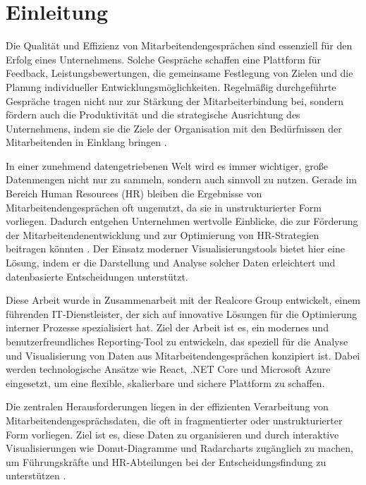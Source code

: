 \chapter{Einleitung}
\label{chap:einleitung}

Die Qualität und Effizienz von Mitarbeitendengesprächen sind essenziell für den Erfolg eines Unternehmens. Solche Gespräche schaffen eine Plattform für Feedback, Leistungsbewertungen, die gemeinsame Festlegung von Zielen und die Planung individueller Entwicklungsmöglichkeiten. Regelmäßig durchgeführte Gespräche tragen nicht nur zur Stärkung der Mitarbeiterbindung bei, sondern fördern auch die Produktivität und die strategische Ausrichtung des Unternehmens, indem sie die Ziele der Organisation mit den Bedürfnissen der Mitarbeitenden in Einklang bringen \cite{schober2008, bryson2011employee}.

In einer zunehmend datengetriebenen Welt wird es immer wichtiger, große Datenmengen nicht nur zu sammeln, sondern auch sinnvoll zu nutzen. Gerade im Bereich Human Resources (HR) bleiben die Ergebnisse von Mitarbeitendengesprächen oft ungenutzt, da sie in unstrukturierter Form vorliegen. Dadurch entgehen Unternehmen wertvolle Einblicke, die zur Förderung der Mitarbeitendenentwicklung und zur Optimierung von HR-Strategien beitragen könnten \cite{kirk2016data}. Der Einsatz moderner Visualisierungstools bietet hier eine Lösung, indem er die Darstellung und Analyse solcher Daten erleichtert und datenbasierte Entscheidungen unterstützt. 

Diese Arbeit wurde in Zusammenarbeit mit der Realcore Group entwickelt, einem führenden IT-Dienstleister, der sich auf innovative Lösungen für die Optimierung interner Prozesse spezialisiert hat. Ziel der Arbeit ist es, ein modernes und benutzerfreundliches Reporting-Tool zu entwickeln, das speziell für die Analyse und Visualisierung von Daten aus Mitarbeitendengesprächen konzipiert ist. Dabei werden technologische Ansätze wie React, .NET Core und Microsoft Azure eingesetzt, um eine flexible, skalierbare und sichere Plattform zu schaffen.

Die zentralen Herausforderungen liegen in der effizienten Verarbeitung von Mitarbeitendengesprächsdaten, die oft in fragmentierter oder unstrukturierter Form vorliegen. Ziel ist es, diese Daten zu organisieren und durch interaktive Visualisierungen wie Donut-Diagramme und Radarcharts zugänglich zu machen, um Führungskräfte und HR-Abteilungen bei der Entscheidungsfindung zu unterstützen \cite{kirk2016data, evergreen2016effective}.


